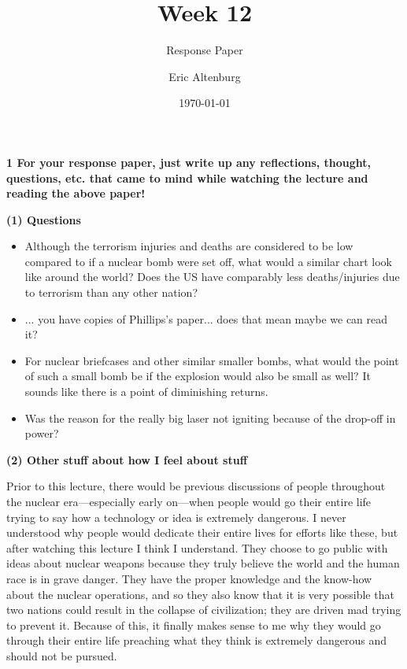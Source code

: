 \documentclass[12pt]{turabian-researchpaper}
\title{Week 12}
\subtitle{Response Paper}
\author{Eric Altenburg}
\date{\today}
\newcommand\question[2]{\noindent\textbf{#1 \quad #2}}
\renewcommand\part[2]{\vspace{.10in}\textbf{(#1) \quad #2}\par}
\begin{document}
\maketitle

\question{1}{For your response paper, just write up any reflections, thought, questions, etc. that came to mind while watching the lecture and reading the above paper!}

	\part{1}{Questions}
	\begin{itemize}
		\item Although the terrorism injuries and deaths are considered to be low compared to if a nuclear bomb were set off, what would a similar chart look like around the world? Does the US have comparably less deaths/injuries due to terrorism than any other nation?
		\item ... you have copies of Phillips’s paper... does that mean maybe we can read it?
		\item For nuclear briefcases and other similar smaller bombs, what would the point of such a small bomb be if the explosion would also be small as well? It sounds like there is a point of diminishing returns.
		\item Was the reason for the really big laser not igniting because of the drop-off in power?
	\end{itemize}

	\part{2}{Other stuff about how I feel about stuff}

	Prior to this lecture, there would be previous discussions of people throughout the nuclear era—especially early on—when people would go their entire life trying to say how a technology or idea is extremely dangerous. I never understood why people would dedicate their entire lives for efforts like these, but after watching this lecture I think I understand. They choose to go public with ideas about nuclear weapons because they truly believe the world and the human race is in grave danger. They have the proper knowledge and the know-how about the nuclear operations, and so they also know that it is very possible that two nations could result in the collapse of civilization; they are driven mad trying to prevent it. Because of this, it finally makes sense to me why they would go through their entire life preaching what they think is extremely dangerous and should not be pursued. 
\end{document}
